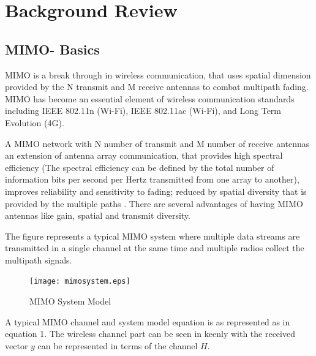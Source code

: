 \documentclass[a4paper, 12pt,titlepage]{dithesis} %
\newcommand{\me}[1]{\( #1 \)}
\begin{document}
\newpage













\chapter{Background Review}

\section{MIMO- Basics}

\ac{MIMO} is a break through in wireless communication, that uses spatial dimension provided by the N transmit and M receive antennas to combat multipath fading. \ac{MIMO} has become an essential element of wireless communication standards including IEEE 802.11n (Wi-Fi), IEEE 802.11ac (Wi-Fi), and Long Term Evolution (4G).

 A \acs{MIMO} network with N number of transmit and M number of receive antennas an extension of antenna array communication, that provides high spectral efficiency (The spectral efficiency can be defined by the total number of information bits per second per Hertz transmitted from one array to another), improves reliability and sensitivity to fading; reduced by spatial diversity that is provided by the multiple paths . There are several advantages of having \acs{MIMO} antennas like gain, spatial and transmit diversity. 
 
 The figure represents a typical \ac{MIMO} system where multiple data streams are  transmitted in a single channel at the same time and multiple radios collect the multipath signals.

\begin{figure}[h]
	\begin{center}
		\texttt{[image: mimosystem.eps]}
		\caption{MIMO System Model}
	\end{center}
\end{figure}


A typical \ac{MIMO} channel and system model equation is as represented as in equation 1. The wireless channel part can be seen in keenly with the received vector \me{y} can be represented in terms of the channel \me{H}. 
\end{document}
